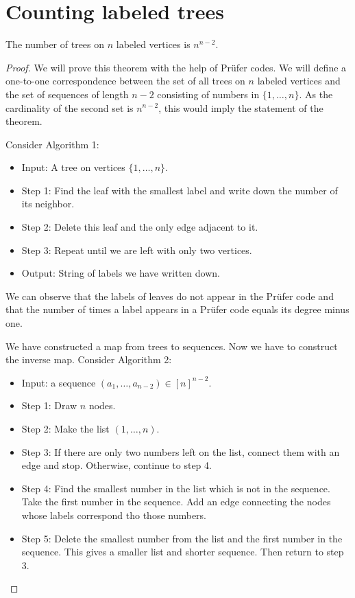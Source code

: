 \section{Counting labeled trees}
\begin{theorem}[Cayley]
The number of trees on $n$ labeled vertices is $n^{n-2}$.
\end{theorem}
\begin{proof}
We will prove this theorem with the help of Prüfer codes. We will define a one-to-one correspondence between the set of all trees on $n$ labeled vertices and the set of sequences of length $n-2$ consisting of numbers in $\{ 1,\dots,n \}$. As the cardinality of the second set is $n^{n-2}$, this would imply the statement of the theorem.

Consider Algorithm 1:
\begin{itemize}
\item Input: A tree on vertices $\{ 1,\dots,n \}$.
\item Step 1: Find the leaf with the smallest label and write down the number of its neighbor.
\item Step 2: Delete this leaf and the only edge adjacent to it.
\item Step 3: Repeat until we are left with only two vertices.
\item Output: String of labels we have written down.
\end{itemize}

We can observe that the labels of leaves do not appear in the Prüfer code and that the number of times a label appears in a Prüfer code equals its degree minus one.

We have constructed a map from trees to sequences. Now we have to construct the inverse map. Consider Algorithm 2:
\begin{itemize}
\item Input: a sequence $(a_{1},\dots,a_{n-2})\in[n]^{n-2}$.
\item Step 1: Draw $n$ nodes.
\item Step 2: Make the list $(1,\dots,n)$.
\item Step 3: If there are only two numbers left on the list, connect them with an edge and stop. Otherwise, continue to step 4.
\item Step 4: Find the smallest number in the list which is not in the sequence. Take the first number in the sequence. Add an edge connecting the nodes whose labels correspond tho those numbers.
\item Step 5: Delete the smallest number from the list and the first number in the sequence. This gives a smaller list and shorter sequence. Then return to step 3.
\end{itemize}
\end{proof}
